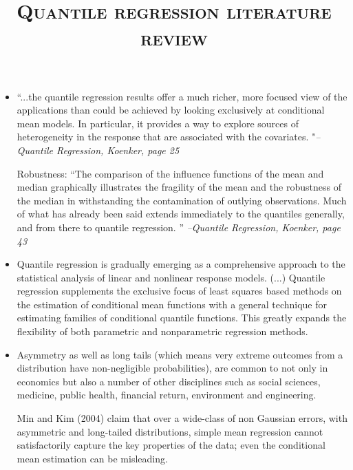 \documentclass{article}
\begin{document}
\title{\textsc{Quantile regression literature review}}
\date{}
\maketitle

\begin{itemize}

\subsection*{Motivations}
\item \cite{koenker2005quantile}``...the quantile regression results offer a much richer, more focused view of the applications than could be achieved by looking exclusively at conditional mean models. In particular, it provides a way to explore sources of heterogeneity in the response that are associated with the covariates. "\hfill {\em --Quantile Regression, Koenker, page 25}\par

Robustness: ``The comparison of the influence functions of the mean and median graphically illustrates the fragility of the mean and the robustness of the median in withstanding the contamination of outlying observations. Much of what has already been said extends immediately to the quantiles generally, and from there to quantile regression. '' \hfill{\em --Quantile Regression, Koenker, page 43}

\item \cite{yu2001bayesian} Quantile regression is gradually emerging as a comprehensive approach to the statistical analysis of linear and nonlinear response models. (...) Quantile regression supplements the exclusive focus of least squares based methods on the estimation of conditional mean functions with a general technique for estimating families of conditional quantile functions. This greatly expands the flexibility of both parametric and nonparametric regression methods.\par


\item \cite{reed2009partially} Asymmetry as well as long tails (which means very extreme outcomes from a distribution have non-negligible probabilities), are common to not only in economics but also a number of other disciplines such as social sciences, medicine, public health, financial return, environment and engineering.\par 

Min and Kim (2004) claim that over a wide-class of non Gaussian errors, with asymmetric and long-tailed distributions, simple mean regression cannot satisfactorily capture the key properties of the data; even the conditional mean estimation can be misleading.\par


\end{itemize}
\end{document}
